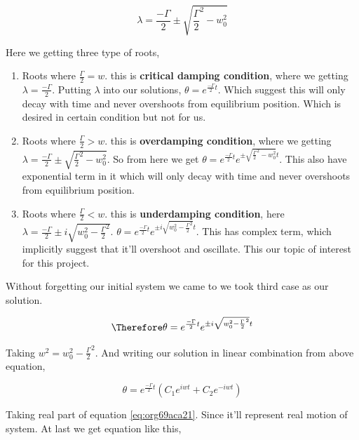 \documentclass{article}
\begin{document}
\begin{equation}
\label{eq:orgf9aa1e8}
\lambda = \frac{-\Gamma}{2} \pm \sqrt{\frac{\Gamma}{2}^{2}-w_{0}^{2}}
\end{equation}

Here we getting three type of roots,

\begin{enumerate}
\item Roots where \(\frac{\Gamma}{2}=w\). this is \textbf{critical damping condition}, where we getting \(\lambda=\frac{-\Gamma}{2}\). Putting \(\lambda\) into our solutions, \(\theta = e^{\frac{-\Gamma}{2}t}\). Which suggest this will only decay with time and never overshoots from equilibrium position. Which is desired in certain condition but not for us.

\item Roots where \(\frac{\Gamma}{2}>w\). this is \textbf{overdamping condition}, where we getting \(\lambda=\frac{-\Gamma}{2}\pm\sqrt{\frac{\Gamma}{2}^{2}-w_{0}^{2}}\). So from here we get \(\theta = e^{\frac{-\Gamma}{2}t}e^{\pm\sqrt{\frac{\Gamma}{2}^{2}-w_{0}^{2}}t}\). This also have exponential term in it which will only decay with time and never overshoots from equilibrium position.

\item Roots where \(\frac{\Gamma}{2}<w\). this is \textbf{underdamping condition}, here  \(\lambda=\frac{-\Gamma}{2}\pm i\sqrt{w_{0}^{2}-\frac{\Gamma}{2}^{2}}\). \(\theta = e^{\frac{-\Gamma}{2}t}e^{\pm i \sqrt{w_{0}^{2}-\frac{\Gamma}{2}^{2}}t}\). This has complex term, which implicitly suggest that it'll overshoot and oscillate. This our topic of interest for this project.
\end{enumerate}


Without forgetting our initial system we came to we took third case as our solution.

\begin{equation*}
\label{eq:org19bc511}
\Therefore \theta = e^{\frac{-\Gamma}{2}t}e^{\pm i \sqrt{w_{0}^{2}-\frac{\Gamma}{2}^{2}}t}
\end{equation*}

Taking \(w^{2} = w_{0}^{2}-\frac{\Gamma}{2}^{2}\). And writing our solution in linear combination from above equation,

\begin{equation}
\label{eq:org69aca21}
\theta = e^{\frac{-\Gamma}{2}t}(C_{1}e^{iwt}+C_{2}e^{-iwt})
\end{equation}

Taking real part of equation \ref{eq:org69aca21}. Since it'll represent real motion of system. At last we get equation like this,
\end{document}
